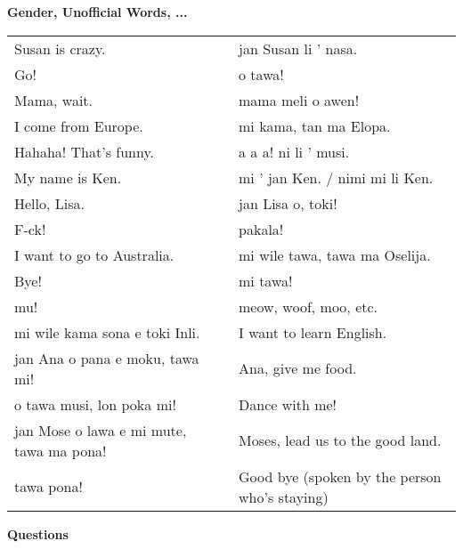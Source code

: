 \textbf{Gender, Unofficial Words, ...} 
\label{'gender_unofficial_words_etc'}

\begin{supertabular}{p{5,5cm}|ll}
Susan is crazy.  && jan Susan li ' nasa. \\ %
Go!  && o tawa! \\ %
Mama, wait.  && mama meli o awen! \\ %
I come from Europe. && mi kama, tan ma Elopa. \\ %
Hahaha! That's funny.  && a a a! ni li ' musi. \\ %
My name is Ken.  && mi ' jan Ken. / nimi mi li Ken. \\ %
Hello, Lisa.  && jan Lisa o, toki! \\ %
F-ck! && pakala! \\ %
I want to go to Australia. && mi wile tawa, tawa ma Oselija. \\  %
Bye!  && mi tawa!  \\ %
mu!  && meow, woof, moo, etc. \\
mi wile kama sona e toki Inli.  && I want to learn English. \\
jan Ana o pana e moku, tawa mi!  && Ana, give me food. \\
o tawa musi, lon poka mi!  && Dance with me! \\
jan Mose o lawa e mi mute, tawa ma pona!  && Moses, lead us to the good land. \\
tawa pona!  && Good bye (spoken by the person who's staying) \\
\end{supertabular} 

\textbf{Questions} 
\label{'questions_using_seme'}


